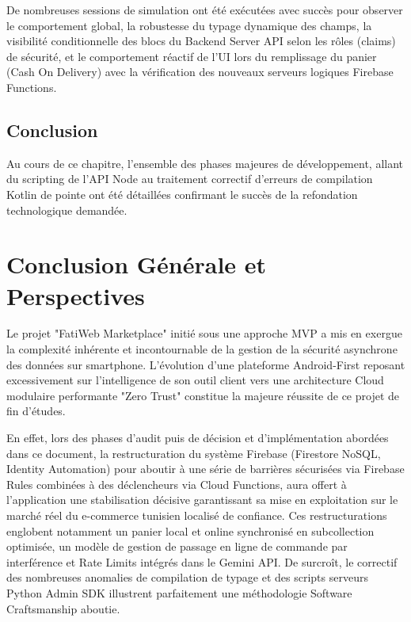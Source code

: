 \documentclass[12pt,a4paper]{report}
\begin{document}
De nombreuses sessions de simulation ont été exécutées avec succès pour observer le comportement global, la robustesse du typage dynamique des champs, la visibilité conditionnelle des blocs du Backend Server API selon les rôles (claims) de sécurité, et le comportement réactif de l'UI lors du remplissage du panier (Cash On Delivery) avec la vérification des nouveaux serveurs logiques Firebase Functions.

\section{Conclusion}
Au cours de ce chapitre, l’ensemble des phases majeures de développement, allant du scripting de l'API Node au traitement correctif d’erreurs de compilation Kotlin de pointe ont été détaillées confirmant le succès de la refondation technologique demandée.

\chapter*{Conclusion Générale et Perspectives}

Le projet "FatiWeb Marketplace" initié sous une approche MVP a mis en exergue la complexité inhérente et incontournable de la gestion de la sécurité asynchrone des données sur smartphone. L'évolution d’une plateforme Android-First reposant excessivement sur l'intelligence de son outil client vers une architecture Cloud modulaire performante "Zero Trust" constitue la majeure réussite de ce projet de fin d'études.

En effet, lors des phases d’audit puis de décision et d'implémentation abordées dans ce document, la restructuration du système Firebase (Firestore NoSQL, Identity Automation) pour aboutir à une série de barrières sécurisées via Firebase Rules combinées à des déclencheurs via Cloud Functions, aura offert à l’application une stabilisation décisive garantissant sa mise en exploitation sur le marché réel du e-commerce tunisien localisé de confiance. Ces restructurations englobent notamment un panier local et online synchronisé en subcollection optimisée, un modèle de gestion de passage en ligne de commande par interférence et Rate Limits intégrés dans le Gemini API. De surcroît, le correctif des nombreuses anomalies de compilation de typage et des scripts serveurs Python Admin SDK illustrent parfaitement une méthodologie Software Craftsmanship aboutie.
\end{document}
